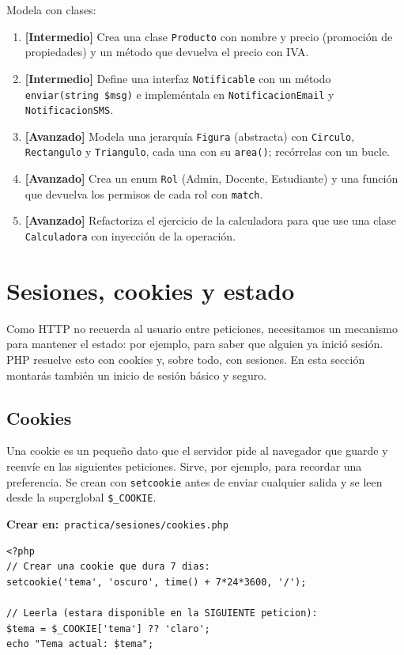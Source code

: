 \documentclass[11pt]{article}
\begin{document}
Modela con clases:

\begin{enumerate}[leftmargin=1.7em,itemsep=3pt,topsep=2pt]
\item \textbf{[Intermedio]} Crea una clase \texttt{Producto} con nombre y precio (promoción de propiedades) y un método que devuelva el precio con IVA.
\item \textbf{[Intermedio]} Define una interfaz \texttt{Notificable} con un método \texttt{enviar(string \$msg)} e impleméntala en \texttt{NotificacionEmail} y \texttt{NotificacionSMS}.
\item \textbf{[Avanzado]} Modela una jerarquía \texttt{Figura} (abstracta) con \texttt{Circulo}, \texttt{Rectangulo} y \texttt{Triangulo}, cada una con su \texttt{area()}; recórrelas con un bucle.
\item \textbf{[Avanzado]} Crea un enum \texttt{Rol} (Admin, Docente, Estudiante) y una función que devuelva los permisos de cada rol con \texttt{match}.
\item \textbf{[Avanzado]} Refactoriza el ejercicio de la calculadora para que use una clase \texttt{Calculadora} con inyección de la operación.
\end{enumerate}
\section{Sesiones, cookies y estado}
Como HTTP no recuerda al usuario entre peticiones, necesitamos un mecanismo para mantener el estado: por ejemplo, para saber que alguien ya inició sesión. PHP resuelve esto con cookies y, sobre todo, con sesiones. En esta sección montarás también un inicio de sesión básico y seguro.

\subsection{Cookies}
Una cookie es un pequeño dato que el servidor pide al navegador que guarde y reenvíe en las siguientes peticiones. Sirve, por ejemplo, para recordar una preferencia. Se crean con \texttt{setcookie} antes de enviar cualquier salida y se leen desde la superglobal \texttt{\$\_COOKIE}.

{\small\color{phpazulo}\textbf{Crear en:}~}\texttt{practica/\allowbreak{}sesiones/\allowbreak{}cookies.\allowbreak{}php}\par\nobreak\vspace{-1pt}
\begin{cajacodigo}[Cookies]
\begin{lstlisting}[style=php]
<?php
// Crear una cookie que dura 7 dias:
setcookie('tema', 'oscuro', time() + 7*24*3600, '/');

// Leerla (estara disponible en la SIGUIENTE peticion):
$tema = $_COOKIE['tema'] ?? 'claro';
echo "Tema actual: $tema";
\end{lstlisting}
\end{cajacodigo}
\vspace{2pt}
\end{document}
